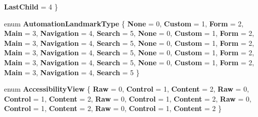 \begin{DoxyCompactItemize}
\newline
{\bfseries Last\+Child} = 4
 \}
\item 
\mbox{\label{namespace_windows_1_1_u_i_1_1_xaml_1_1_automation_1_1_peers_a7841d4ce398126516a6081408b8e9c0d}} 
enum {\bfseries Automation\+Landmark\+Type} \{ \newline
{\bfseries None} = 0, 
{\bfseries Custom} = 1, 
{\bfseries Form} = 2, 
{\bfseries Main} = 3, 
\newline
{\bfseries Navigation} = 4, 
{\bfseries Search} = 5, 
{\bfseries None} = 0, 
{\bfseries Custom} = 1, 
\newline
{\bfseries Form} = 2, 
{\bfseries Main} = 3, 
{\bfseries Navigation} = 4, 
{\bfseries Search} = 5, 
\newline
{\bfseries None} = 0, 
{\bfseries Custom} = 1, 
{\bfseries Form} = 2, 
{\bfseries Main} = 3, 
\newline
{\bfseries Navigation} = 4, 
{\bfseries Search} = 5, 
{\bfseries None} = 0, 
{\bfseries Custom} = 1, 
\newline
{\bfseries Form} = 2, 
{\bfseries Main} = 3, 
{\bfseries Navigation} = 4, 
{\bfseries Search} = 5, 
\newline
{\bfseries None} = 0, 
{\bfseries Custom} = 1, 
{\bfseries Form} = 2, 
{\bfseries Main} = 3, 
\newline
{\bfseries Navigation} = 4, 
{\bfseries Search} = 5
 \}
\item 
\mbox{\label{namespace_windows_1_1_u_i_1_1_xaml_1_1_automation_1_1_peers_aaf97ef41301cdde06f4cd3f8213a5478}} 
enum {\bfseries Accessibility\+View} \{ \newline
{\bfseries Raw} = 0, 
{\bfseries Control} = 1, 
{\bfseries Content} = 2, 
{\bfseries Raw} = 0, 
\newline
{\bfseries Control} = 1, 
{\bfseries Content} = 2, 
{\bfseries Raw} = 0, 
{\bfseries Control} = 1, 
\newline
{\bfseries Content} = 2, 
{\bfseries Raw} = 0, 
{\bfseries Control} = 1, 
{\bfseries Content} = 2, 
\newline
{\bfseries Raw} = 0, 
{\bfseries Control} = 1, 
{\bfseries Content} = 2
 \}
\item 
\mbox{\label{namespace_windows_1_1_u_i_1_1_xaml_1_1_automation_1_1_peers_a4cd1632dc1195eae46e115d12298a6a7}} 

\end{DoxyCompactItemize}
